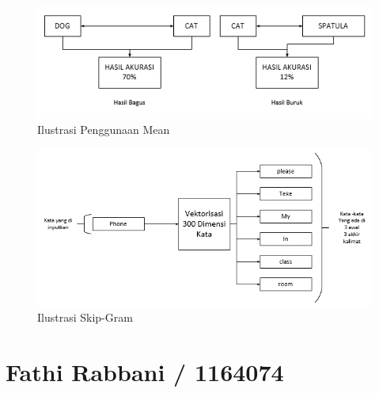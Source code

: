 \begin{figure}
      \centerline{\includegraphics[width=1\textwidth]
      {figures/cokro/c75}}
      \caption{Ilustrasi Penggunaan Mean}
      \label{c75}
      \end{figure}


\begin{figure}
      \centerline{\includegraphics[width=1\textwidth]
      {figures/cokro/c76}}
      \caption{Ilustrasi Skip-Gram}
      \label{c76}
      \end{figure}

\section{Fathi Rabbani / 1164074}
